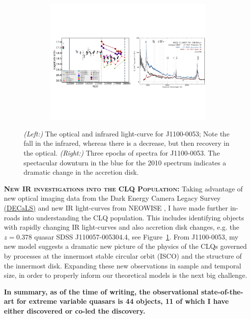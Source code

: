 \begin{figure}[h]
  \begin{center}
    \hspace{-0.5cm}
    \includegraphics[height=6.25cm,width=17.2cm]
    {figures/J110057_LC_Spectra_20171024.pdf}
    \vspace{-10pt}
    \caption{\footnotesize 
      {\it (Left:)} The optical and infrared light-curve for
      J1100-0053; Note the fall in the infrared, whereas there is a
      decrease, but then recovery in the optical.  {\it (Right:)} Three
      epochs of spectra for J1100-0053.  The spectacular downturn in the
      blue for the 2010 spectrum indicates a dramatic change in the
      accretion disk.}
    \vspace{-16pt}
    \label{fig:J1100}
  \end{center}
\end{figure}

\smallskip
\smallskip
\noindent
\textbf{\textsc{New IR investigations into the CLQ Population:}}
Taking advantage of new optical imaging data from the Dark Energy
Camera Legacy Survey \href{http://legacysurvey.org/decamls/}{(DECaLS)}
and new IR light-curves from NEOWISE \citep{Meisner2017a,
Meisner2017b}, I have made further in-roads into understanding the CLQ
population. This includes identifying objects with rapidly changing IR
light-curves and also accretion disk changes, e.g. the $z=0.378$
quasar SDSS J110057-005304.4, see Figure~\ref{fig:J1100}. From
J1100-0053, my new model \citep{Ross2018} suggests a dramatic new
picture of the physics of the CLQs governed by processes at the
innermost stable circular orbit (ISCO) and the structure of the
innermost disk. Expanding these new observations in sample and
temporal size, in order to properly inform our theoretical
models is the next big challenge.

\smallskip
\smallskip
\noindent
{\bf In summary, as of the time of writing, the
observational state-of-the-art for extreme variable quasars is 44
objects, 11 of which I have either discovered or co-led the
discovery.}



